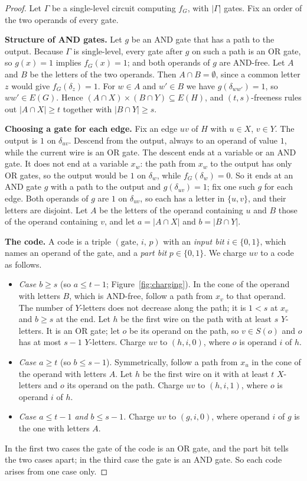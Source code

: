 \documentclass[11pt]{article}
\theoremstyle{definition}
\theoremstyle{remark}
\begin{document}
\begin{proof}
Let $\Gamma$ be a single-level circuit computing $f_G$, with $|\Gamma|$ gates. Fix an order of the two operands of
every gate.

\textbf{Structure of AND gates.} Let $g$ be an AND gate that has a path to the output. Because $\Gamma$ is
single-level, every gate after $g$ on such a path is an OR gate, so $g(x)=1$ implies $f_G(x)=1$; and both operands of
$g$ are AND-free. Let $A$ and $B$ be the letters of the two operands. Then $A\cap B=\emptyset$, since a common letter
$z$ would give $f_G(\delta_z)=1$. For $w\in A$ and $w'\in B$ we have $g(\delta_{ww'})=1$, so $ww'\in E(G)$. Hence
$(A\cap X)\times(B\cap Y)\subseteq E(H)$, and $(t,s)$-freeness rules out $|A\cap X|\ge t$ together with
$|B\cap Y|\ge s$.

\textbf{Choosing a gate for each edge.} Fix an edge $uv$ of $H$ with $u\in X$, $v\in Y$. The output is $1$ on
$\delta_{uv}$. Descend from the output, always to an operand of value $1$, while the current wire is an OR gate. The
descent ends at a variable or an AND gate. It does not end at a variable $x_w$: the path from $x_w$ to the output has
only OR gates, so the output would be $1$ on $\delta_w$, while $f_G(\delta_w)=0$. So it ends at an AND gate $g$ with a
path to the output and $g(\delta_{uv})=1$; fix one such $g$ for each edge. Both operands of $g$ are $1$ on
$\delta_{uv}$, so each has a letter in $\{u,v\}$, and their letters are disjoint. Let $A$ be the letters of the operand
containing $u$ and $B$ those of the operand containing $v$, and let $a=|A\cap X|$ and $b=|B\cap Y|$.

\textbf{The code.} A code is a triple $(\text{gate},\,i,\,p)$ with an \emph{input bit} $i\in\{0,1\}$, which names an
operand of the gate, and a \emph{part bit} $p\in\{0,1\}$. We charge $uv$ to a code as follows.
\begin{itemize}
\item \emph{Case $b\ge s$} (so $a\le t-1$; Figure~\ref{fig:charging}). In the cone of the operand with letters
$B$, which is AND-free, follow a path from $x_v$ to that operand. The number of $Y$-letters does not decrease along the
path; it is $1<s$ at $x_v$ and $b\ge s$ at the end. Let $h$ be the first wire on the path with at least $s$
$Y$-letters. It is an OR gate; let $o$ be its operand on the path, so $v\in S(o)$ and $o$ has at most $s-1$
$Y$-letters. Charge $uv$ to $(h,i,0)$, where $o$ is operand $i$ of $h$.
\item \emph{Case $a\ge t$} (so $b\le s-1$). Symmetrically, follow a path from $x_u$ in the cone of the operand with
letters $A$. Let $h$ be the first wire on it with at least $t$ $X$-letters and $o$ its operand on the path. Charge $uv$
to $(h,i,1)$, where $o$ is operand $i$ of $h$.
\item \emph{Case $a\le t-1$ and $b\le s-1$.} Charge $uv$ to $(g,i,0)$, where operand $i$ of $g$ is the one with
letters $A$.
\end{itemize}
In the first two cases the gate of the code is an OR gate, and the part bit tells the two cases apart; in the third
case the gate is an AND gate. So each code arises from one case only.


\end{proof}
\end{document}
